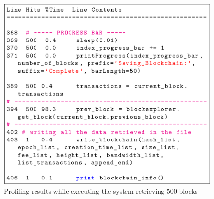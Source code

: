 \documentclass[USenglish]{uit-thesis}
\begin{document}
\begin{figure}[h]
	\centering
	\includegraphics[width=1\textwidth]{img/profile}
	\caption{Profiling results while executing the system retrieving $500$ blocks}
	\label{fig:profile}
\end{figure}
\end{document}
